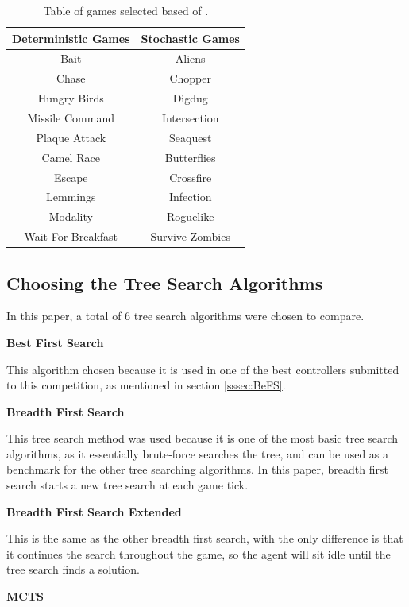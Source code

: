 \documentclass[journal]{IEEEtran}
\begin{document}
	
	\begin{table}[h!]
	\centering
	\begin{tabular} { |c||c|} 
		 \hline
		 \bf{Deterministic Games} & \bf{Stochastic Games} \\
		 \hline
		 Bait & Aliens  \\
 		Chase  & Chopper   \\
		Hungry Birds  & Digdug   \\
		Missile Command  & Intersection   \\
		Plaque Attack  & Seaquest   \\
		Camel Race  & Butterflies   \\
		Escape  & Crossfire   \\
		Lemmings  & Infection   \\
		Modality  & Roguelike   \\
		Wait For Breakfast  & Survive Zombies   \\
		\hline
	\end{tabular}
	\caption{ Table of games selected based of \cite{guerrero2017beyond, gaina2017population}.}
	\label{GamesTable}
	\end{table}

	\subsection{Choosing the Tree Search Algorithms}
	In this paper, a total of 6 tree search algorithms were chosen to compare.
	
	\textbf{Best First Search}

	This algorithm chosen because it is used in one of the best controllers submitted to this competition, as mentioned in section \ref{sssec:BeFS}.

	\textbf{Breadth First Search}

This tree search method was used because it is one of the most basic tree search algorithms, as it essentially brute-force searches the tree, and can be used as a benchmark for the other tree searching algorithms. In this paper, breadth first search starts a new tree search at each game tick.

	\textbf{Breadth First Search Extended}

	This is the same as the other breadth first search, with the only difference is that it continues the search throughout the game, so the agent will sit idle until the tree search finds a solution.

	\textbf{MCTS}
\end{document}
